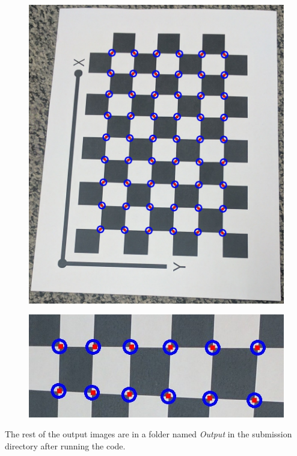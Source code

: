 \documentclass[conference]{IEEEtran}
\begin{document}
\begin{figure}[H]
\centering
\includegraphics[scale = 0.2]{14.jpg}
\label{fig_sim}
\end{figure}

\begin{figure}[H]
\centering
\includegraphics[scale = 0.45]{15.jpg}
\label{fig_sim}
\end{figure}

The rest of the output images are in a folder named \textit{Output} in the submission directory after running the code.
\end{document}
